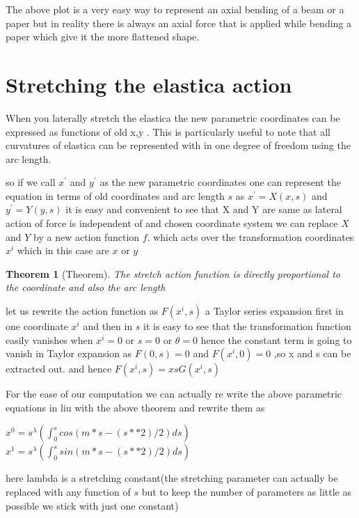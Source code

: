 \documentclass[longbibliography]{revtex4-1}
\begin{document}

The above plot is a very easy way to represent an axial bending of a beam or a paper but in reality there is always an axial force that is applied while bending a paper which give it the more flattened shape.

\section{Stretching the elastica action}
When you laterally stretch the elastica the new parametric coordinates can be expressed as functions of old x,y . This is particularly useful to note that all curvatures of elastica can be represented with in one degree of freedom using the arc length.

so if we call $x^{'}$ and $y^{'}$ as the new parametric coordinates one can represent the equation in terms of old coordinates and arc length $s$ as $x^{'} =  X(x,s)$ and $y^{'} = Y(y,s)$ it is easy and convenient to see that X and Y are same as lateral action of force is independent of and chosen coordinate system  we can replace $X$ and $Y$ by a new action function $f$. which acts over the transformation coordinates $x^{i}$ which in this case are $x$ or $y$

\newtheorem{thm}{Theorem}
\begin{thm}[Theorem]
The stretch action function is directly proportional to the coordinate and also the arc length
\end{thm}

let us rewrite the action function as $F(x^{i},s)$ a Taylor series expansion first in one coordinate $x^{i}$ and then in $s$
it is easy to see that the transformation function easily vanishes when $x^{i}=0$ or $s=0$ or $\theta=0$
hence the constant term is going to vanish in Taylor expansion as $F(0,s)=0$ and $F(x^{i},0)=0$ ,so x and s can be extracted out.
and hence $F(x^{i},s) = xsG(x^{i},s)$

For the ease of our computation we can actually re write the above parametric equations in liu with the above theorem and rewrite them as

 $x^{0}= s^{\lambda} (\int_{0}^{s} cos(m*s-(s**2)/2) ds)$ 
 $x^{1}= s^{\lambda} (\int_{0}^{s} sin(m*s-(s**2)/2) ds)$ 

 here lambda is a stretching constant(the stretching parameter can actually be replaced with any function of $s$ but to keep the number of parameters as little as possible we stick with just one constant)
\end{document}

